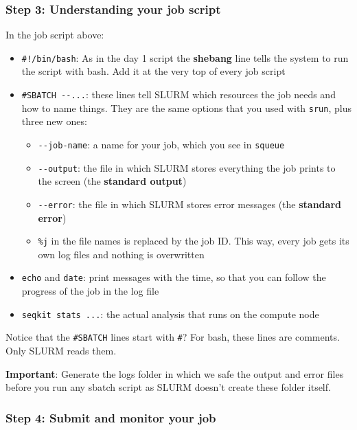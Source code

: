 \documentclass[
  letterpaper,
  DIV=11,
  numbers=noendperiod]{scrreprt}
\providecommand{\tightlist}{%
  \setlength{\itemsep}{0pt}\setlength{\parskip}{0pt}}
\begin{document}
\subsubsection{Step 3: Understanding your job
script}\label{step-3-understanding-your-job-script}

In the job script above:

\begin{itemize}
\tightlist
\item
  \texttt{\#!/bin/bash}: As in the day 1 script the \textbf{shebang}
  line tells the system to run the script with bash. Add it at the very
  top of every job script
\item
  \texttt{\#SBATCH\ -\/-...}: these lines tell SLURM which resources the
  job needs and how to name things. They are the same options that you
  used with \texttt{srun}, plus three new ones:

  \begin{itemize}
  \tightlist
  \item
    \texttt{-\/-job-name}: a name for your job, which you see in
    \texttt{squeue}
  \item
    \texttt{-\/-output}: the file in which SLURM stores everything the
    job prints to the screen (the \textbf{standard output})
  \item
    \texttt{-\/-error}: the file in which SLURM stores error messages
    (the \textbf{standard error})
  \item
    \texttt{\%j} in the file names is replaced by the job ID. This way,
    every job gets its own log files and nothing is overwritten
  \end{itemize}
\item
  \texttt{echo} and \texttt{date}: print messages with the time, so that
  you can follow the progress of the job in the log file
\item
  \texttt{seqkit\ stats\ ...}: the actual analysis that runs on the
  compute node
\end{itemize}

Notice that the \texttt{\#SBATCH} lines start with \texttt{\#}? For
bash, these lines are comments. Only SLURM reads them.

\textbf{Important}: Generate the logs folder in which we safe the output
and error files before you run any sbatch script as SLURM doesn't create
these folder itself.

\subsubsection{Step 4: Submit and monitor your
job}\label{step-4-submit-and-monitor-your-job}
\end{document}
